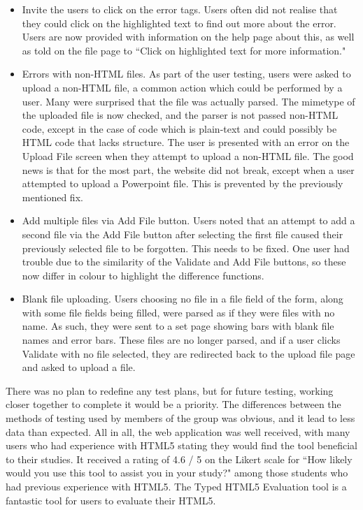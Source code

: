 \documentclass[10pt]{article}
\begin{document}
\begin{itemize}
\item Invite the users to click on the error tags. Users often did not realise that they could click on the highlighted text to find out more about the error. Users are now provided with information on the help page about this, as well as told on the file page to ``Click on highlighted text for more information." 
\item Errors with non-HTML files. As part of the user testing, users were asked to upload a non-HTML file, a common action which could be performed by a user. Many were surprised that the file was actually parsed. The mimetype of the uploaded file is now checked, and the parser is not passed non-HTML code, except in the case of code which is plain-text and could possibly be HTML code that lacks structure. The user is presented with an error on the Upload File screen when they attempt to upload a non-HTML file. The good news is that for the most part, the website did not break, except when a user attempted to upload a Powerpoint file. This is prevented by the previously mentioned fix.
\item Add multiple files via Add File button. Users noted that an attempt to add a second file via the Add File button after selecting the first file caused their previously selected file to be forgotten. This needs to be fixed. One user had trouble due to the similarity of the Validate and Add File buttons, so these now differ in colour to highlight the difference functions.
\item Blank file uploading. Users choosing no file in a file field of the form, along with some file fields being filled, were parsed as if they were files with no name. As such, they were sent to a set page showing bars with blank file names and error bars. These files are no longer parsed, and if a user clicks Validate with no file selected, they are redirected back to the upload file page and asked to upload a file.
\end{itemize}

There was no plan to redefine any test plans, but for future testing, working closer together to complete it would be a priority. The differences between the methods of testing used by members of the group was obvious, and it lead to less data than expected. All in all, the web application was well received, with many users who had experience with HTML5 stating they would find the tool beneficial to their studies. It received a rating of 4.6 / 5 on the Likert scale for ``How likely would you use this tool to assist you in your study?" among those students who had previous experience with HTML5. The Typed HTML5 Evaluation tool is a fantastic tool for users to evaluate their HTML5.
\end{document}
